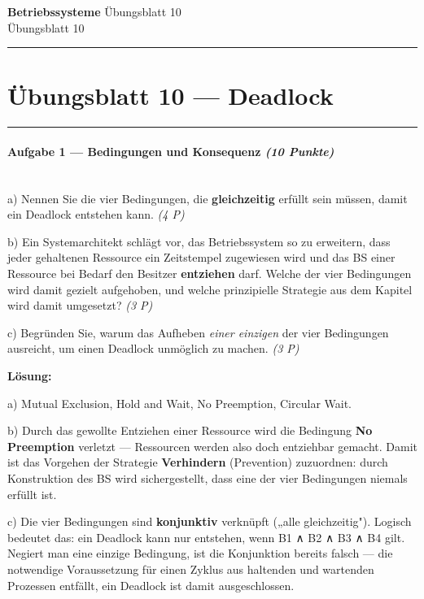 \documentclass[11pt, a4paper]{article}
\providecommand{\nichttitle}{Übungsblatt}
\providecommand{\nichtsubtitle}{}
\renewcommand{\nichttitle}{Betriebssysteme}
\renewcommand{\nichtsubtitle}{Übungsblatt 10}
\begin{document}
\begin{center}
{\Large\bfseries\color{accent}\nichttitle}
\ifx\nichtsubtitle\empty\else
  \\[2pt]{\normalsize\color{accent!80!black}\nichtsubtitle}
\fi
\\[2pt]
\color{accent}\rule{0.4\linewidth}{0.8pt}\color{black}
\end{center}
\vspace{4pt}


\section{Übungsblatt 10 — Deadlock}


\noindent\textcolor{rulegray}{\rule{\linewidth}{0.4pt}}


\paragraph{Aufgabe 1 — Bedingungen und Konsequenz \textit{(10 Punkte)}}\mbox{}\\[2pt]

a) Nennen Sie die vier Bedingungen, die \textbf{gleichzeitig} erfüllt sein müssen, damit ein Deadlock entstehen kann. \textit{(4 P)}


b) Ein Systemarchitekt schlägt vor, das Betriebssystem so zu erweitern, dass jeder gehaltenen Ressource ein Zeitstempel zugewiesen wird und das BS einer Ressource bei Bedarf den Besitzer \textbf{entziehen} darf. Welche der vier Bedingungen wird damit gezielt aufgehoben, und welche prinzipielle Strategie aus dem Kapitel wird damit umgesetzt? \textit{(3 P)}


c) Begründen Sie, warum das Aufheben \textit{einer einzigen} der vier Bedingungen ausreicht, um einen Deadlock unmöglich zu machen. \textit{(3 P)}


\textbf{Lösung:}


a) Mutual Exclusion, Hold and Wait, No Preemption, Circular Wait.


b) Durch das gewollte Entziehen einer Ressource wird die Bedingung \textbf{No Preemption} verletzt — Ressourcen werden also doch entziehbar gemacht. Damit ist das Vorgehen der Strategie \textbf{Verhindern} (Prevention) zuzuordnen: durch Konstruktion des BS wird sichergestellt, dass eine der vier Bedingungen niemals erfüllt ist.


c) Die vier Bedingungen sind \textbf{konjunktiv} verknüpft („alle gleichzeitig"). Logisch bedeutet das: ein Deadlock kann nur entstehen, wenn B1 ∧ B2 ∧ B3 ∧ B4 gilt. Negiert man eine einzige Bedingung, ist die Konjunktion bereits falsch — die notwendige Voraussetzung für einen Zyklus aus haltenden und wartenden Prozessen entfällt, ein Deadlock ist damit ausgeschlossen.
\end{document}
